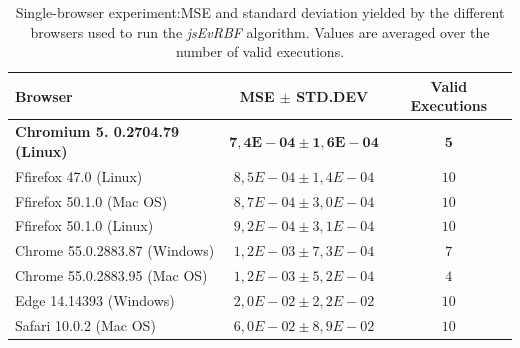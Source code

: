 \documentclass{article}
\begin{document}
\clearpage

\setlength{\tabcolsep}{10pt}
\begin{table}
\caption{Single-browser experiment:MSE and standard deviation yielded by the different browsers used to run the {\em jsEvRBF} algorithm. Values are averaged over the number of valid executions\protect\footnotemark.}
\begin{center}
\begin{tabular}{lcc}
{\bf Browser}	 & \bf{MSE} 	$\mathbf{\pm}$ {\bf STD.DEV}	 & 	{\bf Valid Executions}	 \\
\hline
\bf Chromium 5. 0.2704.79 (Linux)	 & 	$\mathbf{7,4E-04 \pm 	1,6E-04}$	 & 	$\mathbf{5}$	 \\
Ffirefox 47.0 (Linux)	 & 	$8,5E-04	 \pm 	1,4E-04$	 & 	$10$	 \\
Ffirefox 50.1.0 (Mac OS)	 & 	$8,7E-04	 \pm 	3,0E-04$	 & 	$10$	 \\
Ffirefox 50.1.0 (Linux)	 & 	$9,2E-04	 \pm 	3,1E-04$	 & 	$10$	 \\
Chrome 55.0.2883.87 (Windows)	 & 	$1,2E-03	 \pm 	7,3E-04$	 & 	$7$	 \\
Chrome 55.0.2883.95 (Mac OS)	 & 	$1,2E-03	 \pm 	5,2E-04$	 & 	$4$	 \\
Edge 14.14393 (Windows)	 & 	$2,0E-02	 \pm	2,2E-02$	 & 	$10$	 \\
Safari 10.0.2 (Mac OS)	 & 	$6,0E-02	\pm 	8,9E-02$	 & 	$10$	 \\

\hline
\end{tabular}
\end{center}
\end{table}

\label{tab:results-per-browser-second-experiment}
\end{document}
